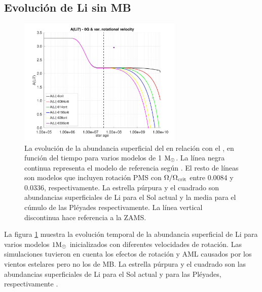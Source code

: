\subsection{Evolución de Li sin MB}

\begin{figure}
    \centering
	\includegraphics[width=0.7\textwidth]{img/paper1/li_var_vel_0_0g.pdf}
	\caption{La evolución de la abundancia superficial del  en relación con el , en función del tiempo para varios modelos de 1 $\mathrm{M}_\odot$. La línea negra continua representa el modelo de referencia según \cite{Choi2016}. El resto de líneas son modelos que incluyen rotación PMS con $\Omega / \Omega_{\mathrm{crit}}$ entre 0.0084 y 0.0336, respectivamente. La estrella púrpura y el cuadrado son abundancias superficiales de Li para el Sol actual \cite{Asplund2009} y la media para el cúmulo de las Pléyades \cite{Sestito2005} respectivamente. La línea vertical discontinua hace referencia a la ZAMS.}
	\label{fig:li_var_vel_0g}
\end{figure}

La figura \ref{fig:li_var_vel_0g} muestra la evolución temporal de la abundancia superficial de Li para varios modelos $1\mathrm{M}_\odot$ inicializados con diferentes velocidades de rotación. Las simulaciones tuvieron en cuenta los efectos de rotación y AML causados por los vientos estelares pero no los de MB. La estrella púrpura y el cuadrado son las abundancias superficiales de Li para el Sol actual \cite{Asplund2009} y para las Pléyades, respectivamente \cite{Sestito2005}.\par

